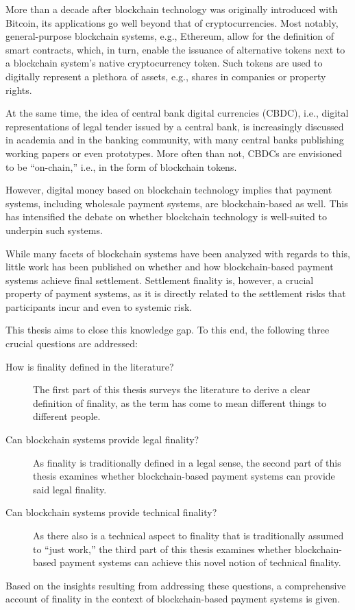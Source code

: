 More than a decade after blockchain technology was originally introduced with Bitcoin, its applications go well beyond that of cryptocurrencies.
Most notably, general-purpose blockchain systems, e.g., Ethereum, allow for the definition of smart contracts, which, in turn, enable the issuance of alternative tokens next to a blockchain system's native cryptocurrency token.
Such tokens are used to digitally represent a plethora of assets, e.g., shares in companies or property rights.

At the same time, the idea of central bank digital currencies (CBDC), i.e., digital representations of legal tender issued by a central bank, is increasingly discussed in academia and in the banking community, with many central banks publishing working papers or even prototypes.
More often than not, CBDCs are envisioned to be ``on-chain,'' i.e., in the form of blockchain tokens.

However, digital money based on blockchain technology implies that payment systems, including wholesale payment systems, are blockchain-based as well.
This has intensified the debate on whether blockchain technology is well-suited to underpin such systems.

While many facets of blockchain systems have been analyzed with regards to this, little work has been published on whether and how blockchain-based payment systems achieve final settlement.
Settlement finality is, however, a crucial property of payment systems, as it is directly related to the settlement risks that participants incur and even to systemic risk.

This thesis aims to close this knowledge gap.
To this end, the following three crucial questions are addressed:

\begin{description}
	\item[How is finality defined in the literature?]
		The first part of this thesis surveys the literature to derive a clear definition of finality, as the term has come to mean different things to different people.
	\item[Can blockchain systems provide legal finality?]
		As finality is traditionally defined in a legal sense, the second part of this thesis examines whether blockchain-based payment systems can provide said legal finality.
	\item[Can blockchain systems provide technical finality?]
		As there also is a technical aspect to finality that is traditionally assumed to ``just work,'' the third part of this thesis examines whether blockchain-based payment systems can achieve this novel notion of technical finality.
\end{description}

Based on the insights resulting from addressing these questions, a comprehensive account of finality in the context of blockchain-based payment systems is given.
